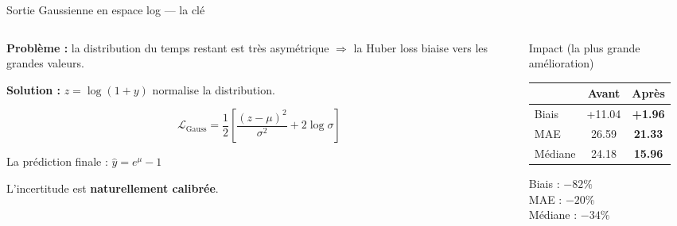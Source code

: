 \documentclass[aspectratio=169,10pt]{beamer}
\newcommand{\hig}[1]{\textcolor{meteoRed}{\textbf{#1}}}
\begin{document}
\begin{frame}{Sortie Gaussienne en espace log — la clé}
\begin{columns}[T]
\begin{column}{0.55\textwidth}
\textbf{Problème :} la distribution du temps restant est très asymétrique $\Rightarrow$ la Huber loss biaise vers les grandes valeurs.

\vspace{0.5em}
\textbf{Solution :} $z = \log(1+y)$ normalise la distribution.

$$\mathcal{L}_{\text{Gauss}} = \frac{1}{2}\left[\frac{(z-\mu)^2}{\sigma^2} + 2\log\sigma\right]$$

\vspace{0.5em}
La prédiction finale : $\hat{y} = e^\mu - 1$

L'incertitude est \textbf{naturellement calibrée}.
\end{column}
\begin{column}{0.42\textwidth}
\begin{block}{Impact (la plus grande amélioration)}
\begin{tabular}{@{}lcc@{}}
         & \textbf{Avant} & \textbf{Après} \\
\midrule
Biais    & +11.04 & \hig{+1.96} \\
MAE      & 26.59  & \hig{21.33} \\
Médiane  & 24.18  & \hig{15.96} \\
\end{tabular}

\vspace{0.5em}
\small Biais : $-82\%$\\
MAE : $-20\%$\\
Médiane : $-34\%$
\end{block}
\end{column}
\end{columns}
\end{frame}
\end{document}
